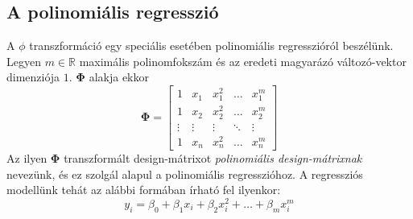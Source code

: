\documentclass[14p]{report}
\def\pmb{\boldsymbol}
\newcounter{x}
\newcounter{y}
\newcounter{z}
\begin{document}
	\subsection{A polinomiális regresszió}
	A $\phi$ transzformáció egy speciális esetében polinomiális regresszióról beszélünk. Legyen $m \in \mathbb{R}$ maximális polinomfokszám és az eredeti magyarázó változó-vektor dimenziója $1$. $\pmb{\Phi}$ alakja ekkor
	\[
		\pmb{\Phi} =
		\begin{bmatrix}
		1 & x_1 & x_1^2 & \dots & x_1^m \\
		1 & x_2 & x_2^2 & \dots & x_2^m \\
		\vdots & \vdots & \vdots & \ddots & \vdots \\
		1 & x_n & x_n^2 & \dots & x_n^m
		\end{bmatrix}
	\]
	Az ilyen $\pmb{\Phi}$ transzformált design-mátrixot \emph{polinomiális design-mátrixnak} nevezünk, és ez szolgál alapul a polinomiális regresszióhoz. A regressziós modellünk tehát az alábbi formában írható fel ilyenkor:
	\[
		y_i = \beta_0 + \beta_1 x_i + \beta_2 x_i^2 + \dots + \beta_m x_i^m
	\]
	
\end{document}
